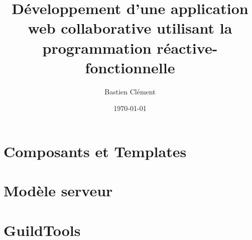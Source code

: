 \documentclass[12pt, a4paper, twoside, frenchb]{book}
\title{Développement d'une application web collaborative utilisant la programmation réactive-fonctionnelle}
\author{Bastien Clément}
\date{\today}
\begin{document}
\maketitle
\tableofcontents




\chapter{Composants et Templates}
\chapter{Modèle serveur}
\chapter{GuildTools}
\end{document}
